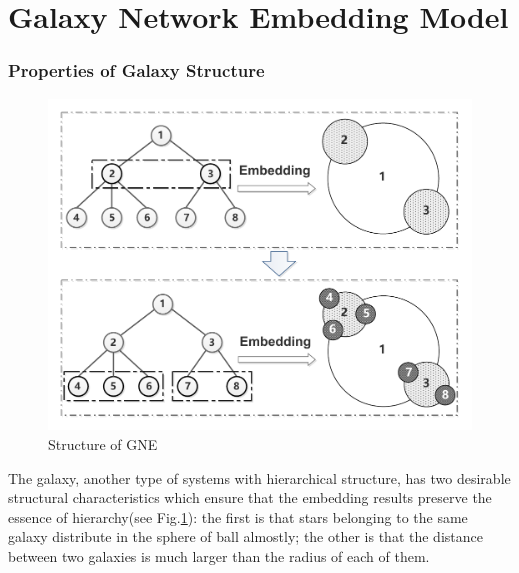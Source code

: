 \documentclass{article}
\theoremstyle{definition}
\begin{document}
	\section{Galaxy Network Embedding Model}
	\label{sec:model}
	 \subsubsection{Properties of Galaxy Structure}
	 \begin{figure}
	 	\centering
		\includegraphics[width=0.6\linewidth]{figure/Structure.pdf}
		\caption{Structure of GNE}
		\label{fig:structure}
	 \end{figure}
	 
	 The galaxy, another type of systems with hierarchical structure, has two desirable structural characteristics which ensure that the embedding results preserve the essence of hierarchy(see Fig.\ref{fig:structure}): the first is that stars belonging to the same galaxy distribute in the sphere of ball almostly; the other is that the distance between two galaxies is much larger than the radius of each of them.
	 
\end{document}

